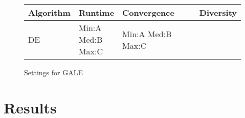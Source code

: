 \documentclass[conference]{IEEEtran}
\begin{document}
\begin{figure}
\centering
\begin{tabular}{| >{\centering\arraybackslash}m{1in} | >{\centering\arraybackslash}m{1in} | >{\centering\arraybackslash}m{1in} | >{\centering\arraybackslash}m{1in} |}
\hline
Algorithm & Runtime & Convergence & Diversity \\ \hline
DE & \shortstack{Min:A \\ Med:B \\ Max:C} & Min:A \newline Med:B \newline Max:C & 100   \\ \hline 
\end{tabular}
\caption{Settings for GALE}
\label{fig:results}
\end{figure}




\section{Results}



\end{document}
